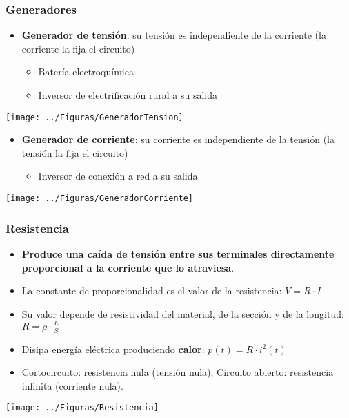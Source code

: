 \documentclass[serif, xcolor=dvipsnames]{beamer}
\begin{document}
\begin{frame}
  \frametitle{Generadores}
  \begin{itemize}
  \item \textbf{Generador de tensión}: su tensión es independiente de
    la corriente (la corriente la fija el circuito)

    \begin{itemize}
    \item Batería electroquímica
    \item Inversor de electrificación rural a su salida
    \end{itemize}
  \end{itemize}
  \begin{center}
    \texttt{[image: ../Figuras/GeneradorTension]}
    \par\end{center}
  \begin{itemize}
  \item \textbf{Generador de corriente}: su corriente es independiente
    de la tensión (la tensión la fija el circuito)

    \begin{itemize}
    \item Inversor de conexión a red a su salida
    \end{itemize}
  \end{itemize}
  \begin{center}
    \texttt{[image: ../Figuras/GeneradorCorriente]}
    \par\end{center}


\end{frame}
\begin{frame}
  \frametitle{Resistencia}
  \begin{itemize}
  \item \textbf{Produce una caída de tensión entre sus terminales
      directamente proporcional a la corriente que lo atraviesa}.
  \item La constante de proporcionalidad es el valor de la
    resistencia: $V=R\cdot I$
  \item Su valor depende de resistividad del material, de la sección y
    de la longitud: $R=\rho\cdot\frac{L}{S}$
  \item Disipa energía eléctrica produciendo \textbf{calor}:
    $p(t)=R\cdot i^{2}(t)$
  \item Cortocircuito: resistencia nula (tensión nula); Circuito
    abierto: resistencia infinita (corriente nula).
  \end{itemize}
  \begin{center}
    \texttt{[image: ../Figuras/Resistencia]}
    \par\end{center}


\end{frame}
\end{document}
